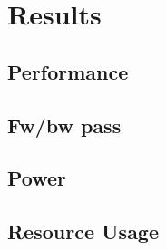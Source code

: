 \chapter{Results}
\section{Performance}
\section{Fw/bw pass}
\section{Power}
\section{Resource Usage}